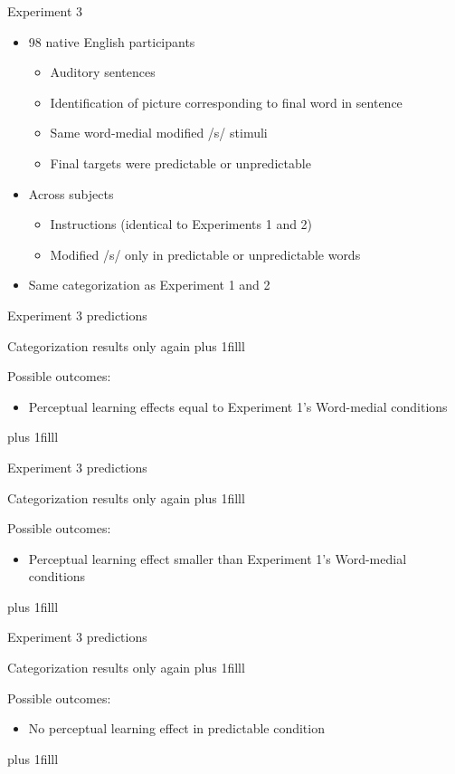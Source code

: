 \documentclass{beamer}
\newcommand{\btVFill}{\vskip0pt plus 1filll}
\begin{document}
\begin{frame}{Experiment 3}

\begin{itemize}
\item 98 native English participants
\begin{itemize}
\item Auditory sentences
\item Identification of picture corresponding to final word in sentence
\item Same word-medial modified /s/ stimuli
\item Final targets were predictable or unpredictable
\end{itemize}
\item Across subjects
\begin{itemize}
\item Instructions (identical to Experiments 1 and 2)
\item Modified /s/ only in predictable or unpredictable words
\end{itemize}
\item Same categorization as Experiment 1 and 2
\end{itemize}

\end{frame}

\begin{frame}{Experiment 3 predictions}

Categorization results only again
\btVFill

Possible outcomes:
\begin{itemize}
\item Perceptual learning effects equal to Experiment 1's Word-medial conditions
\end{itemize}
\btVFill
\end{frame}

\begin{frame}{Experiment 3 predictions}

Categorization results only again
\btVFill

Possible outcomes:
\begin{itemize}
\item Perceptual learning effect smaller than Experiment 1's Word-medial conditions
\end{itemize}
\btVFill
\end{frame}

\begin{frame}{Experiment 3 predictions}

Categorization results only again
\btVFill

Possible outcomes:
\begin{itemize}
\item No perceptual learning effect in predictable condition
\end{itemize}
\btVFill
\end{frame}
\end{document}
